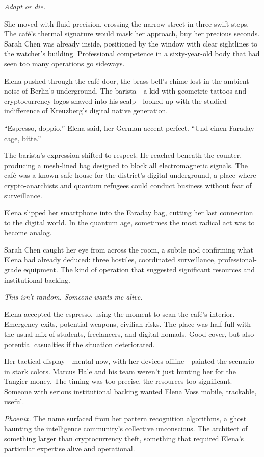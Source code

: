 \emph{Adapt or die.}

She moved with fluid precision, crossing the narrow street in three swift steps. The café's thermal signature would mask her approach, buy her precious seconds. Sarah Chen was already inside, positioned by the window with clear sightlines to the watcher's building. Professional competence in a sixty-year-old body that had seen too many operations go sideways.

Elena pushed through the café door, the brass bell's chime lost in the ambient noise of Berlin's underground. The barista---a kid with geometric tattoos and cryptocurrency logos shaved into his scalp---looked up with the studied indifference of Kreuzberg's digital native generation.

``Espresso, doppio,'' Elena said, her German accent-perfect. ``Und einen Faraday cage, bitte.''

The barista's expression shifted to respect. He reached beneath the counter, producing a mesh-lined bag designed to block all electromagnetic signals. The café was a known safe house for the district's digital underground, a place where crypto-anarchists and quantum refugees could conduct business without fear of surveillance.

Elena slipped her smartphone into the Faraday bag, cutting her last connection to the digital world. In the quantum age, sometimes the most radical act was to become analog.

Sarah Chen caught her eye from across the room, a subtle nod confirming what Elena had already deduced: three hostiles, coordinated surveillance, professional-grade equipment. The kind of operation that suggested significant resources and institutional backing.

\emph{This isn't random. Someone wants me alive.}

Elena accepted the espresso, using the moment to scan the café's interior. Emergency exits, potential weapons, civilian risks. The place was half-full with the usual mix of students, freelancers, and digital nomads. Good cover, but also potential casualties if the situation deteriorated.

Her tactical display---mental now, with her devices offline---painted the scenario in stark colors. Marcus Hale and his team weren't just hunting her for the Tangier money. The timing was too precise, the resources too significant. Someone with serious institutional backing wanted Elena Voss mobile, trackable, useful.

\emph{Phoenix.} The name surfaced from her pattern recognition algorithms, a ghost haunting the intelligence community's collective unconscious. The architect of something larger than cryptocurrency theft, something that required Elena's particular expertise alive and operational.

